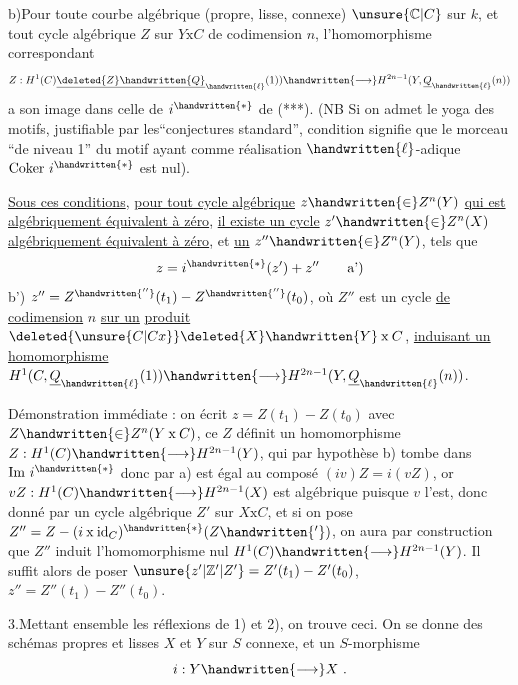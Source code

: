 b)\quad Pour toute courbe algébrique (propre, lisse, connexe) $\unsure{\mathbb{C}|C}$ sur $k$, et tout cycle algébrique $Z$ sur $Y\mathbin{\mathrm{x}}C$ de codimension $n$, l'homomorphisme correspondant
\[
Z:H^1(C)\underline{\deleted{Z}\handwritten{Q}}_{\handwritten{\ell}}(1))\handwritten{\longrightarrow}H^{2n-1}(Y,\underline{Q}_{\handwritten{\ell}}(n))
\]
a son image dans celle de $i^{\handwritten{*}}$ de (***). (NB Si on admet le yoga des motifs, justifiable par les``conjectures standard'',  condition signifie que le  morceau  ``de niveau 1'' du motif  ayant comme réalisation $\handwritten{\ell}$-adique $\mathrm{Coker}\ i^{\handwritten{*}}$ est nul).

\uline{Sous ces conditions}, \uline{pour tout cycle algébrique} $z\handwritten{\in}Z^n(Y)$ \uline{qui est algébriquement équivalent à zéro}, \uline{il existe un cycle} $z'\handwritten{\in}Z^n(X)$ \uline{algébriquement équivalent à zéro}, et \uline{un} $z''\handwritten{\in}Z^n(Y)$, tels que
\[
z=i^{\handwritten{*}}(z')+z''\tag*{a')}
\]
b')\quad {} $z''=Z^{\handwritten{''}}(t_1)-Z^{\handwritten{''}}(t_0)$, où $Z''$ est un cycle \uline{de codimension} $n$ \uline{sur un} \uline{produit} $\deleted{\unsure{C|Cx}}\deleted{X}\handwritten{Y}\mathbin{\mathrm{x}}C$, \uline{induisant un homomorphisme}   $H^1(C,\underline{Q}_{\handwritten{\ell}}(1))\handwritten{\longrightarrow}H^{2n-1}(Y,\underline{Q}_{\handwritten{\ell}}(n))$.

Démonstration immédiate : on écrit $z=Z(t_1)-Z(t_0)$ avec $Z\handwritten{\in}Z^n(Y\mathbin{\mathrm{x}}C)$, ce $Z$ définit un homomorphisme $Z:H^1(C)\handwritten{\longrightarrow}H^{2n-1}(Y)$,  qui par hypothèse b) tombe dans $\mathrm{Im}\ i^{\handwritten{*}}$ donc par  a) est égal au composé $(iv)Z=i(vZ)$, or $vZ:H^1(C)\handwritten{\longrightarrow}H^{2n-1}(X)$ est algébrique puisque $v$ l'est, donc donné par un cycle algébrique $Z'$ sur $X\mathbin{\mathrm{x}}C$, et si on pose $Z''=Z-(i\mathbin{\mathrm{x}}\mathrm{id}_C)^{\handwritten{*}}(Z\handwritten{'} )$, on aura par construction que $Z''$ induit l'homomorphisme nul $H^1(C)\handwritten{\longrightarrow}H^{2n-1}(Y)$.  Il suffit alors de poser $\unsure{z'|\mathbb{Z}'|Z'}=Z'(t_1)-Z'(t_0)$, $z''=Z''(t_1)-Z''(t_0)$.

3.\quad Mettant ensemble les réflexions de 1) et 2), on trouve ceci. On se donne des schémas propres et lisses $X$ et $Y$ sur $S$  connexe, et un $S$-morphisme
\[
i:Y\handwritten{\longrightarrow}X\ .
\]
